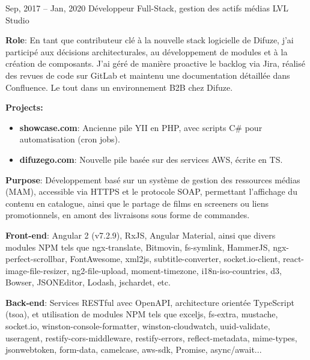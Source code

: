 \documentclass[
  a4paper,
   maincolor=cvblue,
   sectioncolor=cvblue,
   sidebarwidth=0.323\paperwidth,
]{fortysecondscv}
\begin{document}
\begin{cvtableNew}
  \vspace{1.6mm}



  \cvitemRightNew
    {Sep, 2017 – Jan, 2020} %
    {Développeur Full-Stack, gestion des actifs médias} %
    {LVL Studio} %
      {
        \vspace{0.2pt} %
        \fontsize{10.8pt}{12pt}\selectfont %
        \textbf{Role}: En tant que contributeur clé à la nouvelle stack logicielle de Difuze, j’ai participé aux décisions architecturales, au développement de modules et à la création de composants. J’ai géré de manière proactive le backlog via Jira, réalisé des revues de code sur GitLab et maintenu une documentation détaillée dans Confluence. Le tout dans un environnement B2B chez Difuze.\vspace{5pt}

        \vspace{0.1pt} %
        \textbf{Projects:}
        \begin{itemize}[itemsep=1mm, topsep=5pt, leftmargin=8pt]
          \item \textbf{showcase.com}: Ancienne pile YII en PHP, avec scripts C\# pour automatisation (cron jobs).
          \item \textbf{difuzego.com}: Nouvelle pile basée sur des services AWS, écrite en TS.
        \end{itemize}

        \vspace{4pt} %
        \textbf{Purpose}: Développement basé sur un système de gestion des ressources médias (MAM), accessible via HTTPS et le protocole SOAP, permettant l’affichage du contenu en catalogue, ainsi que le partage de films en screeners ou liens promotionnels, en amont des livraisons sous forme de commandes.\vspace{5pt}

        \textbf{Front-end}: Angular 2 (v7.2.9), RxJS, Angular Material, ainsi que divers modules NPM tels que ngx-translate, Bitmovin, fs-symlink, HammerJS, ngx-perfect-scrollbar, FontAwesome, xml2js, subtitle-converter, socket.io-client, react-image-file-resizer, ng2-file-upload, moment-timezone, i18n-iso-countries, d3, Bowser, JSONEditor, Lodash, jschardet, etc.\vspace{5pt}

        \textbf{Back-end}: Services RESTful avec OpenAPI, architecture orientée TypeScript (tsoa), et utilisation de modules NPM tels que exceljs, fs-extra, mustache, socket.io, winston-console-formatter, winston-cloudwatch, uuid-validate, useragent, restify-cors-middleware, restify-errors, reflect-metadata, mime-types, jsonwebtoken, form-data, camelcase, aws-sdk, Promise, async/await...\vspace{5pt}

}
\end{cvtableNew}
\end{document}
